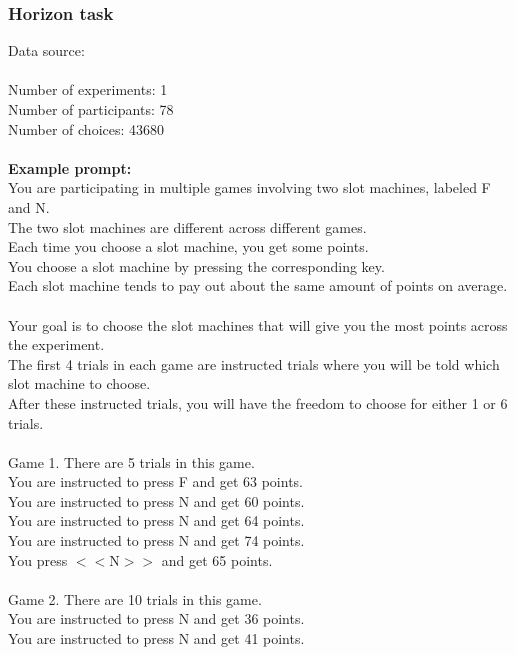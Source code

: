 \documentclass[pdflatex,sn-nature]{sn-jnl}%
\theoremstyle{thmstyleone}%
\theoremstyle{thmstyletwo}%
\theoremstyle{thmstylethree}%
\begin{document}
\subsubsection*{Horizon task}
Data source: \cite{somerville2017charting} \\ $~$ \\
Number of experiments: 1 $~$\\ 
Number of participants: 78 $~$\\ 
Number of choices: 43680 $~$\\ 
 $~$\\ 
\textbf{Example prompt:}
 $~$\\ 
You are participating in multiple games involving two slot machines, labeled F and N. $~$\\ 
The two slot machines are different across different games. $~$\\ 
Each time you choose a slot machine, you get some points. $~$\\ 
You choose a slot machine by pressing the corresponding key. $~$\\ 
Each slot machine tends to pay out about the same amount of points on average. $~$\\ 
Your goal is to choose the slot machines that will give you the most points across the experiment. $~$\\ 
The first 4 trials in each game are instructed trials where you will be told which slot machine to choose. $~$\\ 
After these instructed trials, you will have the freedom to choose for either 1 or 6 trials. $~$\\ 
 $~$\\ 
Game 1. There are 5 trials in this game. $~$\\ 
You are instructed to press F and get 63 points. $~$\\ 
You are instructed to press N and get 60 points. $~$\\ 
You are instructed to press N and get 64 points. $~$\\ 
You are instructed to press N and get 74 points. $~$\\ 
You press $<<$N$>>$ and get 65 points. $~$\\ 
 $~$\\ 
Game 2. There are 10 trials in this game. $~$\\ 
You are instructed to press N and get 36 points. $~$\\ 
You are instructed to press N and get 41 points. $~$\\ 
\end{document}
